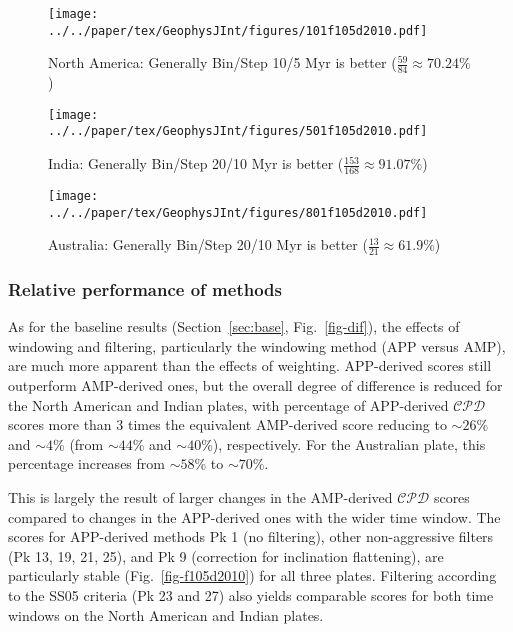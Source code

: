 \begin{figure*}
	\centering
	\begin{subfigure}{1\textwidth}
		\texttt{[image: ../../paper/tex/GeophysJInt/figures/101f105d2010.pdf]}
		\caption{North America: Generally Bin/Step 10/5 Myr is better
		($\frac{59}{84}\approx70.24\%$)}\label{fig-101f105d2010}
	\end{subfigure}
	\vspace{.1em}
	\begin{subfigure}{1\textwidth}
		\texttt{[image: ../../paper/tex/GeophysJInt/figures/501f105d2010.pdf]}
		\caption{India: Generally Bin/Step 20/10 Myr is better
		($\frac{153}{168}\approx91.07\%$)}\label{fig-501f105d2010}
	\end{subfigure}
	\vspace{.1em}
	\begin{subfigure}{1\textwidth}
		\texttt{[image: ../../paper/tex/GeophysJInt/figures/801f105d2010.pdf]}
		\caption{Australia: Generally Bin/Step 20/10 Myr is better
		($\frac{13}{21}\approx61.9\%$)}\label{fig-801f105d2010}
	\end{subfigure}
	\caption[]{Differences between grids in Fig.~\ref{fig-dif} (10 Myr bin, 5
Myr step) and Fig.~\ref{fig-dif2010} (20 Myr bin, 10 Myr step). The absolute
difference values less than 1.96-standard-deviation interval of the whole 168
values are labeled in green, more than 1.96-standard-deviation interval labeled
in red.}\label{fig-f105d2010}
\end{figure*}

\subsubsection{Relative performance of methods}

As for the baseline results (Section~\ref{sec:base}, Fig.~\ref{fig-dif}), the
effects of windowing and filtering, particularly the windowing method (APP
versus AMP), are much more apparent than the effects of weighting. APP-derived
scores still outperform AMP-derived ones, but the overall degree of difference
is reduced for the North American and Indian plates, with percentage of
APP-derived $\mathcal{CPD}$ scores more than 3 times the equivalent AMP-derived
score reducing to ${\sim}26$\% and ${\sim}4$\% (from ${\sim}44$\% and
${\sim}40$\%), respectively. For the Australian plate, this percentage increases
from ${\sim}58$\% to ${\sim}70$\%.

This is largely the result of larger changes in the AMP-derived $\mathcal{CPD}$
scores compared to changes in the APP-derived ones with the wider time window.
The scores for APP-derived methods Pk 1 (no filtering), other non-aggressive
filters (Pk 13, 19, 21, 25), and Pk 9 (correction for inclination flattening),
are particularly stable (Fig.~\ref{fig-f105d2010}) for all three plates.
Filtering according to the SS05 criteria (Pk 23 and 27) also yields comparable
scores for both time windows on the North American and Indian plates.

